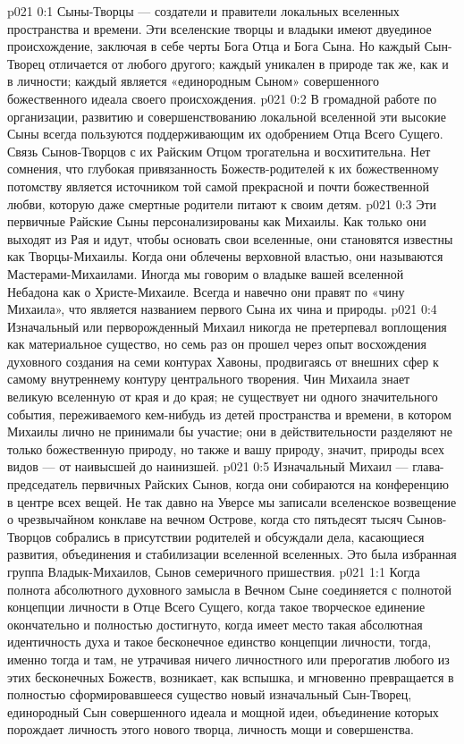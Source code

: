 \author{Совершенствователь Мудрости}
\vs p021 0:1 Сыны\hyp{}Творцы --- создатели и правители локальных вселенных пространства и времени. Эти вселенские творцы и владыки имеют двуединое происхождение, заключая в себе черты Бога Отца и Бога Сына. Но каждый Сын\hyp{}Творец отличается от любого другого; каждый уникален в природе так же, как и в личности; каждый является «единородным Сыном» совершенного божественного идеала своего происхождения.
\vs p021 0:2 В громадной работе по организации, развитию и совершенствованию локальной вселенной эти высокие Сыны всегда пользуются поддерживающим их одобрением Отца Всего Сущего. Связь Сынов\hyp{}Творцов с их Райским Отцом трогательна и восхитительна. Нет сомнения, что глубокая привязанность Божеств\hyp{}родителей к их божественному потомству является источником той самой прекрасной и почти божественной любви, которую даже смертные родители питают к своим детям.
\vs p021 0:3 Эти первичные Райские Сыны персонализированы как Михаилы. Как только они выходят из Рая и идут, чтобы основать свои вселенные, они становятся известны как Творцы\hyp{}Михаилы. Когда они облечены верховной властью, они называются Мастерами\hyp{}Михаилами. Иногда мы говорим о владыке вашей вселенной Небадона как о Христе\hyp{}Михаиле. Всегда и навечно они правят по «чину Михаила», что является названием первого Сына их чина и природы.
\vs p021 0:4 \pc Изначальный или перворожденный Михаил никогда не претерпевал воплощения как материальное существо, но семь раз он прошел через опыт восхождения духовного создания на семи контурах Хавоны, продвигаясь от внешних сфер к самому внутреннему контуру центрального творения. Чин Михаила знает великую вселенную от края и до края; не существует ни одного значительного события, переживаемого кем\hyp{}нибудь из детей пространства и времени, в котором Михаилы лично не принимали бы участие; они в действительности разделяют не только божественную природу, но также и вашу природу, значит, природы всех видов --- от наивысшей до наинизшей.
\vs p021 0:5 Изначальный Михаил --- глава\hyp{}председатель первичных Райских Сынов, когда они собираются на конференцию в центре всех вещей. Не так давно на Уверсе мы записали вселенское возвещение о чрезвычайном конклаве на вечном Острове, когда сто пятьдесят тысяч Сынов\hyp{}Творцов собрались в присутствии родителей и обсуждали дела, касающиеся развития, объединения и стабилизации вселенной вселенных. Это была избранная группа Владык\hyp{}Михаилов, Сынов семеричного пришествия.
\vs p021 1:1 Когда полнота абсолютного духовного замысла в Вечном Сыне соединяется с полнотой концепции личности в Отце Всего Сущего, когда такое творческое единение окончательно и полностью достигнуто, когда имеет место такая абсолютная идентичность духа и такое бесконечное единство концепции личности, тогда, именно тогда и там, не утрачивая ничего личностного или прерогатив любого из этих бесконечных Божеств, возникает, как вспышка, и мгновенно превращается в полностью сформировавшееся существо новый изначальный Сын\hyp{}Творец, единородный Сын совершенного идеала и мощной идеи, объединение которых порождает личность этого нового творца, личность мощи и совершенства.
